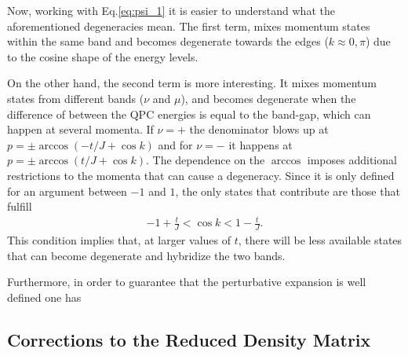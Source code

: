 \documentclass{article}
\begin{document}
Now, working with Eq.\eqref{eq:psi_1} it is easier to understand what the aforementioned degeneracies mean. The first term, mixes momentum states within the same band and becomes degenerate towards the edges ($k\approx 0, \pi$) due to the cosine shape of the energy levels. 

On the other hand, the second term is more interesting. It mixes momentum states from different bands ($\nu$ and $\mu$), and becomes degenerate when the difference of between the QPC energies is equal to the band-gap, which can happen at several momenta. If $\nu = +$ the denominator blows up at $p=\pm \arccos(-t/J + \cos k)$ and for $\nu = -$ it happens at $p=\pm \arccos(t/J + \cos k)$. The dependence on the $\arccos$ imposes additional restrictions to the momenta that can cause a degeneracy. Since it is only defined for an argument between $-1$ and $1$, the only states that contribute are those that fulfill
\begin{align}
    -1 + \frac{t}{J} < \cos k < 1 - \frac{t}{J}.
\end{align}
This condition implies that, at larger values of $t$, there will be less available states that can become degenerate and hybridize the two bands. 

Furthermore, in order to guarantee that the perturbative expansion is well defined one has

\subsection{Corrections to the Reduced Density Matrix}




\end{document}
